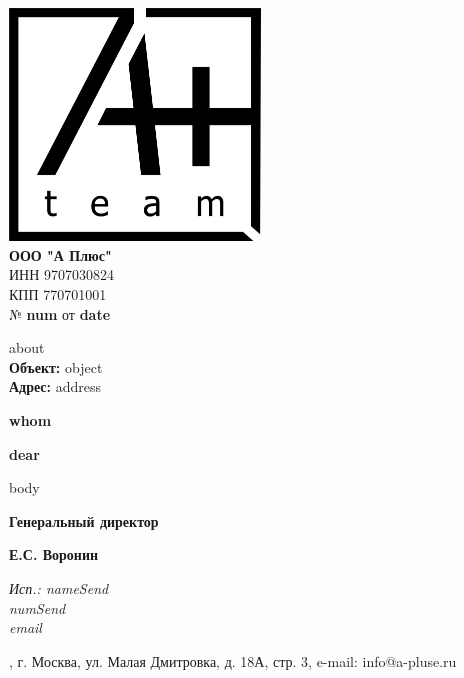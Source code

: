 \documentclass[a4paper,12pt]{letter}
\begin{document}
\noindent
\begin{minipage}[t]{0.5\textwidth}
    \vspace{0pt} %
    \includegraphics[width=0.5\textwidth]{A.png} \\ %
    \textbf{ООО "А Плюс"} \\
    ИНН 9707030824 \\
    КПП 770701001 \\
    № \textbf{ {{num}} } от \textbf{ {{date}} } \\
\end{minipage}%

\begin{minipage}[t]{0.5\textwidth} 
    {{about}} \\
    \textbf{Объект:} {{object}} \\
    \textbf{Адрес:} {{address}}
\end{minipage}%
\begin{minipage}[t]{0.5\textwidth}
    \raggedleft
    \bfseries
    {{whom}}
\end{minipage}

\vspace{1cm}

\begin{center}
    \textbf{ {{dear}} }
\end{center}


\vspace{0.5cm}

{{body}}

\vspace{1cm}


\begin{minipage}[t]{0.4\textwidth}
    \textbf{Генеральный директор}
\end{minipage}%
\begin{minipage}[t]{0.2\textwidth}
    \centering
    \underline{\hspace{5cm}}
\end{minipage}%
\begin{minipage}[t]{0.4\textwidth}
    \raggedleft
    \textbf{Е.С. Воронин}
\end{minipage}


\vfill

\noindent
\itshape
Исп.: {{nameSend}} \\
{{numSend}} \\
{{email}}

\noindent\makebox[\linewidth]{\rule{1\paperwidth}{0.4pt}}
\noindent
\centering
\fontsize{9}{10}, г. Москва, ул. Малая Дмитровка, д. 18А, стр. 3, e-mail: info@a-pluse.ru
\end{document}
